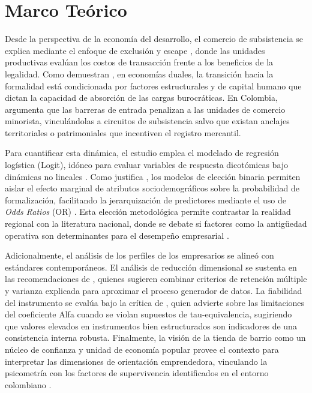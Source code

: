\documentclass[11pt,a4paper]{article}
\begin{document}
\section{Marco Te\'orico}

\par
Desde la perspectiva de la economía del desarrollo, el comercio de subsistencia se explica mediante el enfoque de exclusión y escape \citep{perry2007}, donde las unidades productivas evalúan los costos de transacción frente a los beneficios de la legalidad. Como demuestran \citet{laporta2014}, en economías duales, la transición hacia la formalidad está condicionada por factores estructurales y de capital humano que dictan la capacidad de absorción de las cargas burocráticas. En Colombia, \citet{fernandez2020} argumenta que las barreras de entrada penalizan a las unidades de comercio minorista, vinculándolas a circuitos de subsistencia salvo que existan anclajes territoriales o patrimoniales que incentiven el registro mercantil.

\par
Para cuantificar esta dinámica, el estudio emplea el modelado de regresión logística (Logit), idóneo para evaluar variables de respuesta dicotómicas bajo dinámicas no lineales \citep{greene2018}. Como justifica \citet{lopez2020}, los modelos de elección binaria permiten aislar el efecto marginal de atributos sociodemográficos sobre la probabilidad de formalización, facilitando la jerarquización de predictores mediante el uso de \textit{Odds Ratios} (OR) \citep{bruce2022}. Esta elección metodológica permite contrastar la realidad regional con la literatura nacional, donde se debate si factores como la antigüedad operativa son determinantes para el desempeño empresarial \citep{mesa2023}.

\par
Adicionalmente, el análisis de los perfiles de los empresarios se alineó con estándares contemporáneos. El análisis de reducción dimensional se sustenta en las recomendaciones de \citet{goretzko2021}, quienes sugieren combinar criterios de retención múltiple y varianza explicada para aproximar el proceso generador de datos. La fiabilidad del instrumento se evalúa bajo la crítica de \citet{mcneish2018}, quien advierte sobre las limitaciones del coeficiente Alfa cuando se violan supuestos de tau-equivalencia, sugiriendo que valores elevados en instrumentos bien estructurados son indicadores de una consistencia interna robusta. Finalmente, la visión de la tienda de barrio como un núcleo de confianza y unidad de economía popular \citep{cadavid2024} provee el contexto para interpretar las dimensiones de orientación emprendedora, vinculando la psicometría con los factores de supervivencia identificados en el entorno colombiano \citep{ruiloba2024}.
\end{document}

